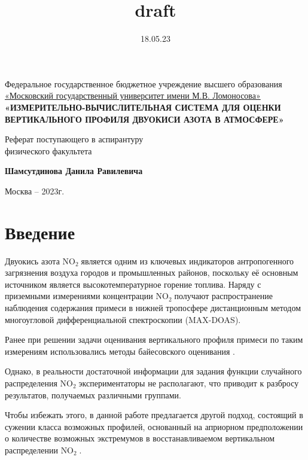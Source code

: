 \documentclass[a4paper,14pt]{article}
\title{draft}
\date{18.05.23}
\theoremstyle{plain}
\theoremstyle{definition}
\theoremstyle{remark}
\newcommand{\nl}{\\ \indent}
\newcommand{\no}{$\text{NO}_2 \;$}
\begin{document}
\newpage
\begin{center}
\hfill \break
Федеральное государственное бюджетное учреждение
высшего образования
\\
\underline{«Московский государственный университет имени М.В. Ломоносова»}
\hfill \break
\hfill \break
\hfill \break
\hfill \break
\large\textbf{«ИЗМЕРИТЕЛЬНО-ВЫЧИСЛИТЕЛЬНАЯ СИСТЕМА ДЛЯ ОЦЕНКИ ВЕРТИКАЛЬНОГО ПРОФИЛЯ ДВУОКИСИ АЗОТА В АТМОСФЕРЕ»}\\

\end{center}

\hfill \break
\hfill \break
\hfill \break

Реферат поступающего в аспирантуру 
\nl
физического факультета

\textbf{Шамсутдинова Данила Равилевича}
\hfill \break
\hfill \break
\hfill \break
\begin{center}
Москва -- 2023г.
\end{center}



\thispagestyle{empty}
\newpage
\tableofcontents
\newpage
\section{Введение}
Двуокись азота \no является одним из ключевых индикаторов
антропогенного загрязнения воздуха городов и промышленных
районов, поскольку её основным источником является
высокотемпературное горение топлива. 
Наряду с приземными измерениями концентрации \no получают
распространение наблюдения содержания примеси в нижней 
тропосфере дистанционным методом многоугловой 
дифференциальной спектроскопии (MAX-DOAS).

Ранее при решении задачи оценивания вертикального профиля примеси
по таким измерениям использовались методы байесовского оценивания
\cite{litlink1}. 

Однако, в реальности достаточной информации для задания функции
случайного распределения \no экспериментаторы не располагают, 
что приводит к разбросу результатов, получаемых различными
группами.
 
Чтобы избежать этого, в данной работе предлагается другой подход,
состоящий в сужении класса возможных профилей, основанный на
априорном предположении о количестве возможных экстремумов в
восстанавливаемом вертикальном распределении \no.
 
\end{document}
